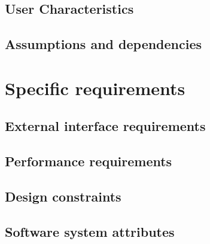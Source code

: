   \section{User Characteristics}
  
  \section{Assumptions and dependencies}
  
  
  \chapter{Specific requirements}
  \section{External interface requirements}
  
  \section{Performance requirements}
  
  \section{Design constraints}
  
  \section{Software system attributes}
  
  
  

